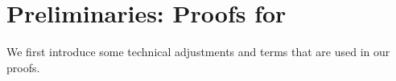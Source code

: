 \section{Preliminaries: Proofs for }
\label{append_sec:prelim}
    


We first introduce some technical adjustments and terms that are used in our proofs.
